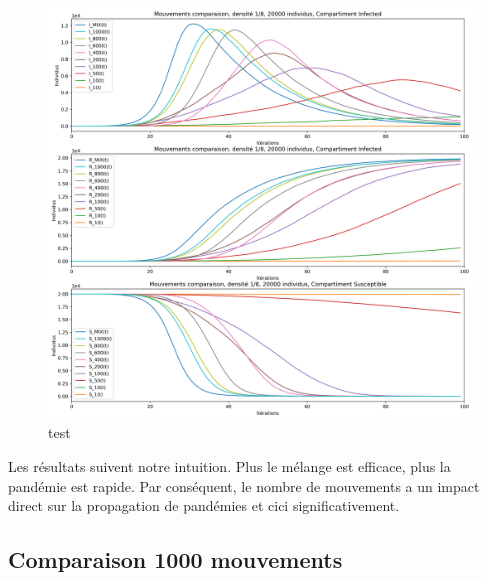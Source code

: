 \begin{figure}[h]
	\centering
	\captionsetup{justification=centering}
	\includegraphics[width=.7\textwidth]{Images/SIR_mouvements_variables.png}
	\caption{test}
\end{figure}

Les résultats suivent notre intuition. Plus le mélange est efficace, plus la pandémie est rapide. Par conséquent, le nombre de mouvements a un impact direct sur la propagation de pandémies et cici significativement. 

\subsection{Comparaison 1000 mouvements}


